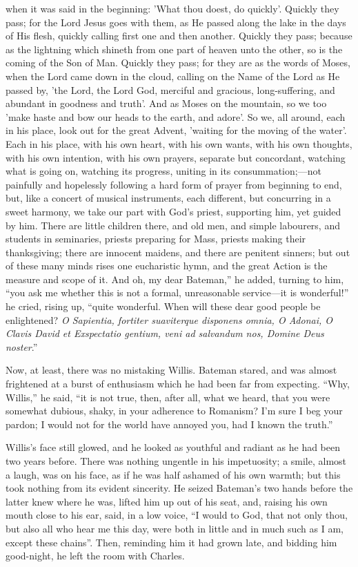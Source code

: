 when it was said in the beginning: 'What thou doest, do quickly'.
Quickly they pass; for the Lord Jesus goes with them, as He passed
along the lake in the days of His flesh, quickly calling first one and
then another. Quickly they pass; because as the lightning which
shineth from one part of heaven unto the other, so is the coming of
the Son of Man. Quickly they pass; for they are as the words of Moses,
when the Lord came down in the cloud, calling on the Name of the Lord
as He passed by, 'the Lord, the Lord God, merciful and gracious,
long-suffering, and abundant in goodness and truth'. And as Moses on
the mountain, so we too 'make haste and bow our heads to the earth,
and adore'. So we, all around, each in his place, look out for the
great Advent, 'waiting for the moving of the water'. Each in his
place, with his own heart, with his own wants, with his own thoughts,
with his own intention, with his own prayers, separate but
concordant, watching what is going on, watching its progress, uniting
in its consummation;—not painfully and hopelessly following a hard
form of prayer from beginning to end, but, like a concert of musical
instruments, each different, but concurring in a sweet harmony, we
take our part with God's priest, supporting him, yet guided by him.
There are little children there, and old men, and simple labourers,
and students in seminaries, priests preparing for Mass, priests making
their thanksgiving; there are innocent maidens, and there are penitent
sinners; but out of these many minds rises one eucharistic hymn, and
the great Action is the measure and scope of it. And oh, my dear
Bateman,'' he added, turning to him, ``you ask me whether this
is not a formal, unreasonable service—it is wonderful!'' he
cried, rising up, ``quite wonderful. When will these dear good
people be enlightened? \emph{O Sapientia, fortiter suaviterque disponens
omnia, O Adonai, O Clavis David et Exspectatio gentium, veni ad
salvandum nos, Domine Deus noster}.''

Now, at least, there was no mistaking Willis. Bateman stared, and
was almost frightened at a burst of enthusiasm which he had been far
from expecting. ``Why, Willis,'' he said, ``it is not
true, then, after all, what we heard, that you were somewhat dubious,
shaky, in your adherence to Romanism? I'm sure I beg your pardon; I
would not for the world have annoyed you, had I known the truth.''

Willis's face still glowed, and he looked as youthful and radiant
as he had been two years before. There was nothing ungentle in his
impetuosity; a smile, almost a laugh, was on his face, as if he
was half ashamed of his own warmth; but this took nothing from its
evident sincerity. He seized Bateman's two hands before the latter
knew where he was, lifted him up out of his seat, and, raising his own
mouth close to his ear, said, in a low voice, ``I would to God,
that not only thou, but also all who hear me this day, were both in
little and in much such as I am, except these chains''. Then,
reminding him it had grown late, and bidding him good-night, he left
the room with Charles.

